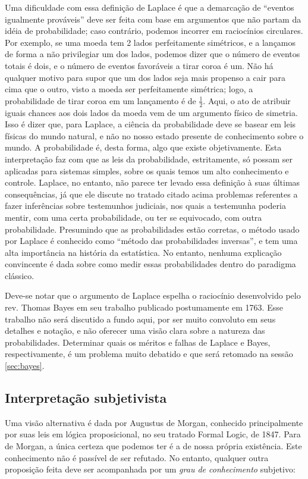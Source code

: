 Uma dificuldade com essa definição de Laplace é que a demarcação de ``eventos igualmente prováveis'' deve ser feita
com base em argumentos que não partam da idéia de probabilidade; caso contrário, podemos incorrer em raciocínios
circulares. Por exemplo, se uma moeda tem 2 lados perfeitamente simétricos, e a lançamos de forma a não privilegiar um dos lados,
podemos dizer que o número de eventos totais é dois, e o número de eventos favoráveis a tirar coroa é um. Não há qualquer motivo
para supor que um dos lados seja mais propenso a cair para cima que o outro, visto a moeda ser perfeitamente simétrica; logo,
a probabilidade de tirar coroa em um lançamento é de $\frac{1}{2}$. Aqui, o ato de atribuir iguais chances aos dois
lados da moeda vem de um argumento físico de simetria. Isso é dizer que, para Laplace,
a ciência da probabilidade deve se basear em leis físicas do mundo natural, e não no nosso estado presente de conhecimento 
sobre o mundo. A probabilidade é, desta forma, algo que existe objetivamente.
Esta interpretação faz com que as leis da probabilidade, estritamente, só possam ser aplicadas para 
sistemas simples, sobre os quais temos um alto conhecimento e controle. Laplace, no entanto, não parece ter levado essa 
definição à suas últimas consequências, já que ele discute no tratado citado acima problemas referentes a fazer inferências 
sobre testemunhos judiciais, nos 
quais a testemunha poderia mentir, com uma certa probabilidade, ou ter se equivocado, com outra probabilidade. 
Presumindo que as probabilidades estão corretas, o método usado por Laplace é conhecido como ``método das probabilidades
inversas'', e tem uma alta importância na história da estatística.  No entanto, 
nenhuma explicação convincente é dada sobre como medir essas probabilidades dentro do paradigma clássico.

Deve-se notar que o argumento de Laplace espelha o raciocínio desenvolvido pelo rev. Thomas Bayes em seu trabalho publicado
postumamente em 1763. Esse trabalho não será discutido a fundo aqui, por ser muito convoluto em seus detalhes e notação,
e não oferecer uma visão clara sobre a natureza das probabilidades.
Determinar quais os méritos e falhas de Laplace e Bayes, respectivamente, é um problema muito debatido e que será retomado na
sessão \ref{sec:bayes}.

\subsection{Interpretação subjetivista}
Uma visão alternativa é dada por Augustus de Morgan, conhecido principalmente por suas leis em lógica proposicional, 
no seu tratado Formal Logic, de 1847. Para de Morgan, a única certeza que podemos ter é a de nossa própria existência. 
Este conhecimento
não é passível de ser refutado. No entanto, qualquer outra proposição feita deve ser acompanhada por 
um {\em grau de conhecimento} subjetivo:

